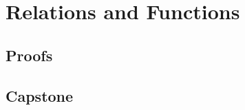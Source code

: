 \chapter{Relations and Functions}
\label{ch:relations-functions}

\LRAExcludeFromPrintEditionBegin
\section*{Proofs}

\section*{Capstone}

\LRAExcludeFromPrintEditionEnd
